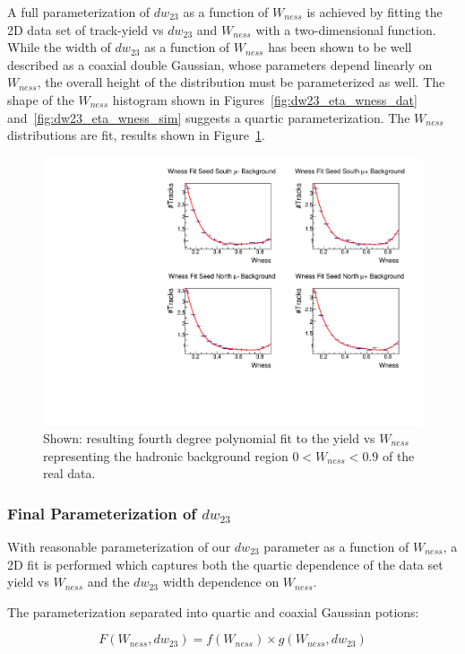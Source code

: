A full parameterization of $dw_{23}$ as a function of $W_{ness}$ is achieved by
fitting the 2D data set of track-yield vs $dw_{23}$ and $W_{ness}$ with a
two-dimensional function. While the width of $dw_{23}$ as a function of
$W_{ness}$ has been shown to be well described as a coaxial double Gaussian,
whose parameters depend linearly on $W_{ness}$, the overall height of the
distribution must be parameterized as well. The shape of the $W_{ness}$
histogram shown in Figures~\ref{fig:dw23_eta_wness_dat}
and~\ref{fig:dw23_eta_wness_sim} suggests a quartic parameterization. The
$W_{ness}$ distributions are fit, results shown in Figure~\ref{fig:wness_pol4}.

\begin{figure}[ht]
  \centering
  \includegraphics[width=0.7\linewidth]{./figures/c_WnessFit1D.pdf}
  \caption{
    Shown: resulting fourth degree polynomial fit to the yield vs $W_{ness}$
    representing the hadronic background region $0 < W_{ness} < 0.9$ of the real
    data.
  }
  \label{fig:wness_pol4}
\end{figure}

\clearpage
\subsubsection{Final Parameterization of $dw_{23}$}

With reasonable parameterization of our $dw_{23}$ parameter as a function of
$W_{ness}$, a 2D fit is performed which captures both the quartic dependence of
the data set yield vs $W_{ness}$ and the $dw_{23}$ width dependence on
$W_{ness}$.

{\noindent} The parameterization separated into quartic and coaxial Gaussian
potions:

\begin{equation}
  F(W_{ness},dw_{23}) = f(W_{ness})\times g(W_{ness},dw_{23}) 
  \label{eq:dw23_final_parameterization}
\end{equation}

